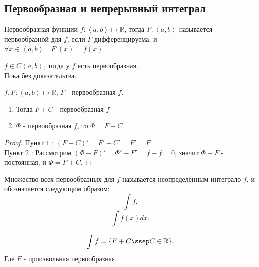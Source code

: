 \documentclass[11pt, oneside]{article}   	%
\begin{document}
    \subsection{Первообразная и непрерывный интеграл}
         \begin{definition}
             Первообразная функции $f : \left<a, b\right> \mapsto \mathbb{R}$, тогда $F : \left<a, b\right> $ называется первообразной для $f$, если $F$ дифференцируема, и $\forall{x\in \left<a, b\right>}\quad F'(x) = f(x)$.
         \end{definition}
         \begin{theorem}
             $f\in C\left<a, b\right>$, тогда у $f$ есть первообразная.\\
             Пока без доказательтва.
         \end{theorem}
         \begin{theorem}
             $f,F: \left<a, b\right> \mapsto \mathbb{R}$, $F$ -  первообразная $f$.\\
             \begin{enumerate}
                 \item Тогда $F+C$ - первообразная $f$ 
                 \item $\Phi$ -  первообразная $f$, то $\Phi = F + C$
             \end{enumerate}
             \begin{proof}
                 Пункт $1$ : $(F+C)' = F'+C' = F' = F$ \\
                 Пункт $2$ : Рассмотрим $(\Phi - F)' = \Phi' - F' = f - f =0$, значит $\Phi - F$ - постоянная, и $\Phi = F + C$.
             \end{proof}
         \end{theorem}
         \begin{definition}
             Множество всех первообразных для $f$ называется неопределённым интеграло $f$, и обозначается следующим образом:
             \[ \int f .\]
             \[ \int f(x)dx.\] 
         \end{definition}
         \begin{dlemma}
             \[ \int f = \{F+C \ssep C\in \mathbb{R}\}  .\]
             Где $F$ - произвольная первообразная.
         \end{dlemma}
\end{document}
